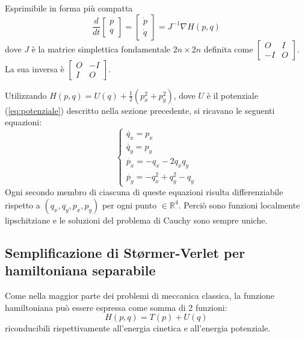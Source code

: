 \documentclass[a4paper, 12pt]{article}
\numberwithin{equation}{section}
\numberwithin{figure}{section}
\begin{document}
Esprimibile in forma più compatta
\begin{equation}
	\frac{d}{dt}
	\begin{bmatrix}
		p\\q
	\end{bmatrix} =
	\begin{bmatrix}
		\dot{p}\\\dot{q}
	\end{bmatrix} = 
	J^{-1}\nabla H(p,q)
\end{equation}
dove $J$ è la matrice simplettica fondamentale $2n\times 2n$ definita come $\begin{bmatrix}
O&I\\-I&O \end{bmatrix}$. La sua inversa è $\begin{bmatrix}
O&-I\\I&O \end{bmatrix}$.

Utilizzando $H(p,q) = U(q)+\frac{1}{2}(p_x^2+p_y^2)$, dove $U$ è il potenziale (\ref{eq:potenziale})
descritto nella sezione precedente, si ricavano le
seguenti equazioni:
\begin{equation}
\begin{cases}
	\dot{q_x} = p_x\\
	\dot{q_y} = p_y\\
	\dot{p_x} = -q_x-2q_x q_y\\
	\dot{p_y} = -q_x^2 + q_y^2 - q_y
\end{cases}\label{eq:leggimoto}
\end{equation}
Ogni secondo membro di ciascuna di queste equazioni risulta differenziabile rispetto a
$(q_x,q_y,p_x,p_y)$ per ogni punto $\in \mathbb{R}^4$. Perciò sono funzioni localmente
lipschitziane e le soluzioni del problema di Cauchy sono sempre uniche.

\subsection{Semplificazione di Størmer-Verlet per hamiltoniana separabile}
Come nella maggior parte dei problemi di meccanica classica, la funzione hamiltoniana
può essere espressa come somma di 2 funzioni:
\begin{equation}
	H(p,q) = T(p) + U(q)
\end{equation}
riconducibili rispettivamente all'energia cinetica e all'energia potenziale.
\end{document}
